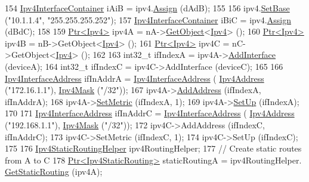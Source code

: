 \begin{DoxyCode}
154   \hyperlink{classns3_1_1Ipv4InterfaceContainer}{Ipv4InterfaceContainer} iAiB = ipv4.\hyperlink{classns3_1_1Ipv4AddressHelper_af8e7f4a1a7e74c00014a1eac445a27af}{Assign} (dAdB);
155 
156   ipv4.\hyperlink{classns3_1_1Ipv4AddressHelper_acf7b16dd25bac67e00f5e25f90a9a035}{SetBase} (\textcolor{stringliteral}{"10.1.1.4"}, \textcolor{stringliteral}{"255.255.255.252"});
157   \hyperlink{classns3_1_1Ipv4InterfaceContainer}{Ipv4InterfaceContainer} iBiC = ipv4.\hyperlink{classns3_1_1Ipv4AddressHelper_af8e7f4a1a7e74c00014a1eac445a27af}{Assign} (dBdC);
158 
159   \hyperlink{classns3_1_1Ptr}{Ptr<Ipv4>} ipv4A = nA->\hyperlink{classns3_1_1Object_a13e18c00017096c8381eb651d5bd0783}{GetObject}<\hyperlink{classns3_1_1Ipv4}{Ipv4}> ();
160   \hyperlink{classns3_1_1Ptr}{Ptr<Ipv4>} ipv4B = nB->GetObject<\hyperlink{classns3_1_1Ipv4}{Ipv4}> ();
161   \hyperlink{classns3_1_1Ptr}{Ptr<Ipv4>} ipv4C = nC->GetObject<\hyperlink{classns3_1_1Ipv4}{Ipv4}> ();
162 
163   int32\_t ifIndexA = ipv4A->\hyperlink{classns3_1_1Ipv4_a637354128b71bc587ea5a6eeaef42469}{AddInterface} (deviceA);
164   int32\_t ifIndexC = ipv4C->AddInterface (deviceC);
165 
166   \hyperlink{classns3_1_1Ipv4InterfaceAddress}{Ipv4InterfaceAddress} ifInAddrA = \hyperlink{classns3_1_1Ipv4InterfaceAddress}{Ipv4InterfaceAddress} (
      \hyperlink{classns3_1_1Ipv4Address}{Ipv4Address} (\textcolor{stringliteral}{"172.16.1.1"}), \hyperlink{classns3_1_1Ipv4Mask}{Ipv4Mask} (\textcolor{stringliteral}{"/32"}));
167   ipv4A->\hyperlink{classns3_1_1Ipv4_ad203526cae6a4b86f1bb89e44d2b62f7}{AddAddress} (ifIndexA, ifInAddrA);
168   ipv4A->\hyperlink{classns3_1_1Ipv4_a2b5632573b67957fabe2dfea248a57a3}{SetMetric} (ifIndexA, 1);
169   ipv4A->\hyperlink{classns3_1_1Ipv4_a71b2f8acca4923aef907b50b3196bf23}{SetUp} (ifIndexA);
170 
171   \hyperlink{classns3_1_1Ipv4InterfaceAddress}{Ipv4InterfaceAddress} ifInAddrC = \hyperlink{classns3_1_1Ipv4InterfaceAddress}{Ipv4InterfaceAddress} (
      \hyperlink{classns3_1_1Ipv4Address}{Ipv4Address} (\textcolor{stringliteral}{"192.168.1.1"}), \hyperlink{classns3_1_1Ipv4Mask}{Ipv4Mask} (\textcolor{stringliteral}{"/32"}));
172   ipv4C->AddAddress (ifIndexC, ifInAddrC);
173   ipv4C->SetMetric (ifIndexC, 1);
174   ipv4C->SetUp (ifIndexC);
175  
176   \hyperlink{classns3_1_1Ipv4StaticRoutingHelper}{Ipv4StaticRoutingHelper} ipv4RoutingHelper;
177   \textcolor{comment}{// Create static routes from A to C}
178   \hyperlink{classns3_1_1Ptr}{Ptr<Ipv4StaticRouting>} staticRoutingA = ipv4RoutingHelper.
      \hyperlink{classns3_1_1Ipv4StaticRoutingHelper_a731206e50d305695dac7fb2ef963a4bb}{GetStaticRouting} (ipv4A);

\end{DoxyCode}
